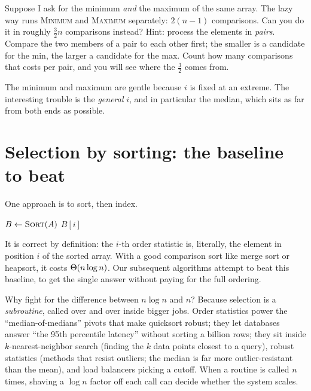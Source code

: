 \begin{walkbox}
Suppose I ask for the minimum \emph{and} the maximum of the same array. The lazy
way runs \textsc{Minimum} and \textsc{Maximum} separately: $2(n-1)$ comparisons.
Can you do it in roughly $\tfrac{3}{2}n$ comparisons instead? Hint: process the
elements in \emph{pairs}. Compare the two members of a pair to each other first;
the smaller is a candidate for the min, the larger a candidate for the max. Count
how many comparisons that costs per pair, and you will see where the $\tfrac{3}{2}$
comes from.
\end{walkbox}

The minimum and maximum are gentle because $i$ is fixed at an extreme. The
interesting trouble is the \emph{general} $i$, and in particular the median, which
sits as far from both ends as possible. 

\section{Selection by sorting: the baseline to beat}

One approach is to sort, then index.

\begin{algorithm}[H]
\caption{\textsc{SelectBySorting}$(A, i)$}\label{ch09:alg-sortselect}
$B \gets \textsc{Sort}(A)$ 
\Return $B[i]$\;
\end{algorithm}

It is correct by definition: the $i$-th order statistic is, literally, the element
in position $i$ of the sorted array. With a good comparison sort like merge sort or
heapsort, it costs $\Theta(n\log n)$. Our subsequent algorithms attempt to beat this baseline, to get the single answer without paying for the full ordering.

\begin{aestheticbox}
Why fight for the difference between $n\log n$ and $n$? Because selection is a
\emph{subroutine}, called over and over inside bigger jobs. Order statistics power
the ``median-of-medians'' pivots that make quicksort robust; they let databases
answer ``the 95th percentile latency'' without sorting a billion rows; they sit
inside $k$-nearest-neighbor search (finding the $k$ data points closest to a query), robust statistics (methods that resist outliers; the median is far more outlier-resistant than the mean), and load balancers picking a cutoff. When a
routine is called $n$ times, shaving a $\log n$ factor off each call can
decide whether the system scales.
\end{aestheticbox}

